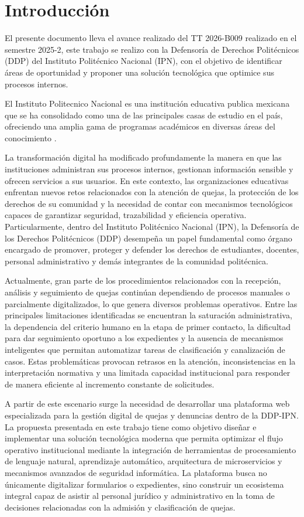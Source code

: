 \chapter{Introducción}
\label{cap:introduccion}
\justifying
El presente documento lleva el avance realizado del TT 2026-B009 realizado en el semestre 2025-2, este trabajo se realizo con la Defensoría de Derechos Politécnicos (DDP) del Instituto Politécnico Nacional (IPN), con el objetivo de identificar áreas de oportunidad y proponer una solución tecnológica que optimice sus procesos internos.

El Instituto Politecnico Nacional es una institución educativa publica mexicana que se ha consolidado como una de las principales casas de estudio en el país, ofreciendo una amplia gama de programas académicos en diversas áreas del conocimiento \cite{1}.


La transformación digital ha modificado profundamente la manera en que las instituciones administran sus procesos internos, gestionan información sensible y ofrecen servicios a sus usuarios. En este contexto, las organizaciones educativas enfrentan nuevos retos relacionados con la atención de quejas, la protección de los derechos de su comunidad y la necesidad de contar con mecanismos tecnológicos capaces de garantizar seguridad, trazabilidad y eficiencia operativa. Particularmente, dentro del Instituto Politécnico Nacional (IPN), la Defensoría de los Derechos Politécnicos (DDP) desempeña un papel fundamental como órgano encargado de promover, proteger y defender los derechos de estudiantes, docentes, personal administrativo y demás integrantes de la comunidad politécnica.

Actualmente, gran parte de los procedimientos relacionados con la recepción, análisis y seguimiento de quejas continúan dependiendo de procesos manuales o parcialmente digitalizados, lo que genera diversos problemas operativos. Entre las principales limitaciones identificadas se encuentran la saturación administrativa, la dependencia del criterio humano en la etapa de primer contacto, la dificultad para dar seguimiento oportuno a los expedientes y la ausencia de mecanismos inteligentes que permitan automatizar tareas de clasificación y canalización de casos. Estas problemáticas provocan retrasos en la atención, inconsistencias en la interpretación normativa y una limitada capacidad institucional para responder de manera eficiente al incremento constante de solicitudes.

A partir de este escenario surge la necesidad de desarrollar una plataforma web especializada para la gestión digital de quejas y denuncias dentro de la DDP-IPN. La propuesta presentada en este trabajo tiene como objetivo diseñar e implementar una solución tecnológica moderna que permita optimizar el flujo operativo institucional mediante la integración de herramientas de procesamiento de lenguaje natural, aprendizaje automático, arquitectura de microservicios y mecanismos avanzados de seguridad informática. La plataforma busca no únicamente digitalizar formularios o expedientes, sino construir un ecosistema integral capaz de asistir al personal jurídico y administrativo en la toma de decisiones relacionadas con la admisión y clasificación de quejas.

